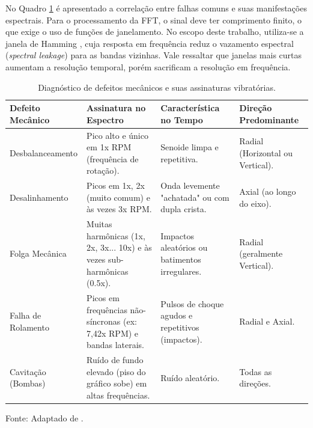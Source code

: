 \documentclass[conference]{IEEEtran}
\begin{document}
\renewcommand{\tablename}{Table}
No Quadro \ref{quadro:diagnostico_defeitos} é apresentado a correlação entre falhas comuns e suas manifestações espectrais. Para o processamento da FFT, o sinal deve ter comprimento finito, o que exige o uso de funções de janelamento. No escopo deste trabalho, utiliza-se a janela de Hamming \cite{girdhar2004practical}, cuja resposta em frequência reduz o vazamento espectral (\textit{spectral leakage}) para as bandas vizinhas. Vale ressaltar que janelas mais curtas aumentam a resolução temporal, porém sacrificam a resolução em frequência.
\begin{table}[!t] %
\centering

\renewcommand{\tablename}{Quadro}

\renewcommand{\tabularxcolumn}[1]{m{#1}}

\begin{tabularx}{\textwidth}{|>{\centering\arraybackslash}X|>{\centering\arraybackslash}X|>{\centering\arraybackslash}X|>{\centering\arraybackslash}X|}
\hline
\rowcolor[HTML]{EFEFEF} 
\textbf{Defeito Mecânico} & \textbf{Assinatura no Espectro} & \textbf{Característica no Tempo} & \textbf{Direção Predominante} \\ \hline
Desbalanceamento & Pico alto e único em 1x RPM (frequência de rotação). & Senoide limpa e repetitiva. & Radial (Horizontal ou Vertical). \\ \hline
Desalinhamento & Picos em 1x, 2x (muito comum) e às vezes 3x RPM. & Onda levemente "achatada" ou com dupla crista. & Axial (ao longo do eixo). \\ \hline
Folga Mecânica & Muitas harmônicas (1x, 2x, 3x... 10x) e às vezes sub-harmônicas (0.5x). & Impactos aleatórios ou batimentos irregulares. & Radial (geralmente Vertical). \\ \hline
Falha de Rolamento & Picos em frequências não-síncronas (ex: 7,42x RPM) e bandas laterais. & Pulsos de choque agudos e repetitivos (impactos). & Radial e Axial. \\ \hline
Cavitação (Bombas) & Ruído de fundo elevado (piso do gráfico sobe) em altas frequências. & Ruído aleatório. & Todas as direções. \\ \hline
\end{tabularx}

\vspace{4pt}

\caption{Diagnóstico de defeitos mecânicos e suas assinaturas vibratórias.}
\label{quadro:diagnostico_defeitos}
\vspace{0.1cm}
{\footnotesize Fonte: Adaptado de \cite{randall2011vibration}.}

\renewcommand{\tablename}{Table} 
\end{table}
\end{document}
